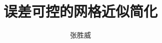 \documentclass[master,oneside]{zjuthesis} %
\title{误差可控的网格近似简化} %
\author{张胜威}
\institute{计算机科学与技术学院}         %
\begin{document}
\maketitle

\abstractmatter



\frontmatter
\tableofcontents %
\listoffigures   %
\listoftables    %
%

\mainmatter

%





\backmatter



%

%

%
\end{document}
